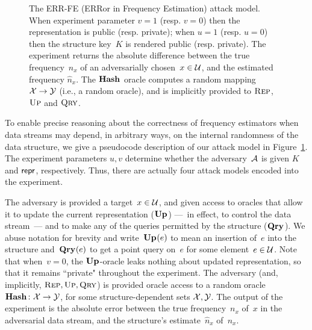 \begin{figure}[h]
\begin{pchstack}[boxed,center,space=0.5em]
\begin{pcvstack}[space=0.45em]
       \end{pcvstack}
   
       \end{pchstack}
   
   
     \caption[The ERR-FE Attack Model.]{The ERR-FE (ERRor in Frequency Estimation) attack model. When experiment parameter $v=1$ (resp. $v=0$) then the representation is public (resp. private); when $u=1$ (resp. $u=0$) then the structure key~$K$ is rendered public (resp. private). The experiment returns the absolute difference between the true frequency~$n_x$ of an adversarially chosen~$x \in \mathcal{U}$, and the estimated frequency $\hat{n}_x$. The $\textup{\textbf{Hash}}\hspace{0.5pt}$ oracle computes a random mapping $\mathcal{X}\to\mathcal{Y}$ (i.e., a random oracle), and is implicitly provided to $\textnormal{\textsc{Rep}}$, $\textnormal{\textsc{Up}}$ and $\textnormal{\textsc{Qry}}$.}
     \label{fig:err-fe-exp} 
   \end{figure}
   

   To enable precise reasoning about the correctness of frequency estimators when data streams may depend, in arbitrary ways, on the internal randomness of the data structure, we give a pseudocode description of our attack model in Figure~\ref{fig:err-fe-exp}. The experiment parameters $u,v$ determine whether the adversary~$\mathcal{A}$ is given $K$ and $\mathsf{repr}$, respectively.  Thus, there are actually four attack models encoded into the experiment.
  
   The adversary is provided a target~$x\in\mathcal{U}$, and given access to oracles that allow it to update the current representation ($\textup{\textbf{Up}}\hspace{0.5pt}$) ---~in effect, to control the data stream~--- and to make any of the queries permitted by the structure ($\textup{\textbf{Qry}}\hspace{0.5pt}$). We abuse notation for brevity and write~$\textup{\textbf{Up}}\hspace{0.5pt}(e)$ to mean an insertion of~$e$ into the structure and~$\textup{\textbf{Qry}}\hspace{0.5pt}(e)$ to get a point query on~$e$ for some element~$e \in \mathcal{U}$. Note that when~$v=0$, the $\textup{\textbf{Up}}\hspace{0.5pt}$-oracle leaks nothing about updated representation, so that it remains ``private" throughout the experiment.  The adversary (and, implicitly, $\textnormal{\textsc{Rep}}, \textnormal{\textsc{Up}}, \textnormal{\textsc{Qry}}$) is provided oracle access to a random oracle~$\textup{\textbf{Hash}}\hspace{0.5pt} \colon \mathcal{X} \to \mathcal{Y}$, for some structure-dependent sets $\mathcal{X},\mathcal{Y}$.  The output of the experiment is the absolute error between the true frequency~$n_x$ of~$x$ in the adversarial data stream, and the structure's estimate~$\hat{n}_x$ of~$n_x$. 
   

